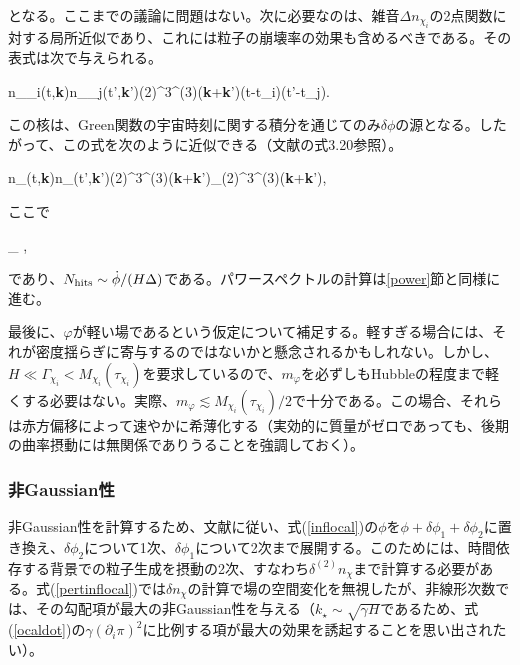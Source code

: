 となる。ここまでの議論に問題はない。次に必要なのは、雑音$\Delta n_{\chi_i}$の2点関数に対する局所近似であり、これには粒子の崩壊率の効果も含めるべきである。その表式は次で与えられる\cite{trapped}。

\be\langle\Delta n_{\chi_i}(t,{\bf k})\Delta n_{\chi_j}(t',{\bf k}')\rangle\simeq(2\pi)^3\delta^{(3)}({\bf k}+{\bf k}')\theta(t-t_i)\theta(t'-t_j).\ee

この核は、Green関数の宇宙時刻に関する積分を通じてのみ$\delta\phi$の源となる。したがって、この式を次のように近似できる（文献\cite{trapped}の式3.20参照）。

\be  \langle\Delta n_\chi(t,{\bf k})\Delta n_\chi(t',{\bf k}')\rangle\simeq  (2\pi)^3\delta^{(3)}({\bf k}+{\bf k}')\equiv \nu_{\chi}(2\pi)^3\delta^{(3)}({\bf k}+{\bf k}'),
\ee

ここで

\beq
\label{nunhits}
\nu_{\chi} \equiv {},
\eeq

であり、$N_{\rm hits}\sim\dot\phi/(H\Delta)$である。パワースペクトルの計算は\ref{power}節と同様に進む。

最後に、$\varphi$が軽い場であるという仮定について補足する。軽すぎる場合には、それが密度揺らぎに寄与するのではないかと懸念されるかもしれない。しかし、$H\ll\Gamma_{\chi_i}<M_{\chi_i}(\tau_{\chi_i})$を要求しているので、$m_\varphi$を必ずしもHubbleの程度まで軽くする必要はない。実際、$m_\varphi\lesssim M_{\chi_i}(\tau_{\chi_i})/2$で十分である。この場合、それらは赤方偏移によって速やかに希薄化する（実効的に質量がゼロであっても、後期の曲率摂動には無関係でありうることを強調しておく）。

\subsubsection{非Gaussian性}

非Gaussian性を計算するため、文献\cite{trapped}に従い、式(\ref{inflocal})の$\phi$を$\phi+\delta\phi_1+\delta\phi_2$に置き換え、$\delta\phi_2$について1次、$\delta\phi_1$について2次まで展開する。このためには、時間依存する背景での粒子生成を摂動の2次、すなわち$\delta^{(2)}n_\chi$まで計算する必要がある。式(\ref{pertinflocal})では$\delta n_\chi$の計算で場の空間変化を無視したが、非線形次数では、その勾配項が最大の非Gaussian性を与える（$k_\star\sim\sqrt{\gamma H}$であるため、式(\ref{ocaldot})の$\gamma(\partial_i\pi)^2$に比例する項が最大の効果を誘起することを思い出されたい）。


